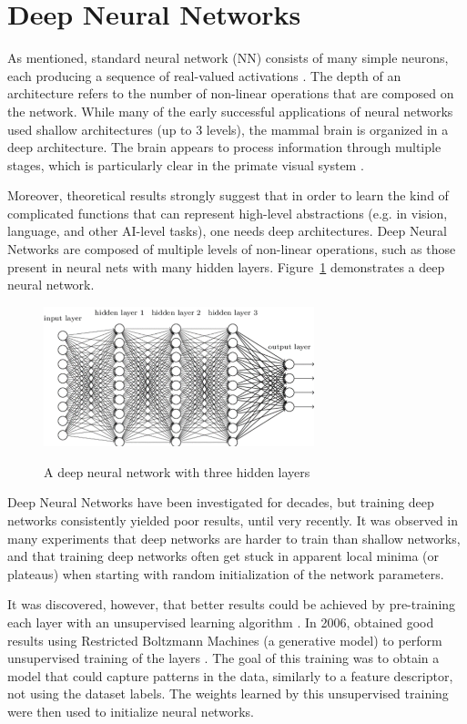 \section{Deep Neural Networks}
\label{sec:deepcnn}
As mentioned, standard neural network (NN) consists of many simple neurons, each producing a sequence of real-valued activations \cite{deepnn}. The depth of an architecture refers to the number of non-linear operations that are composed on the network. While many of the early successful applications of neural networks used shallow architectures (up to 3 levels), the mammal brain is organized in a deep architecture. The brain appears to process information through multiple stages, which is particularly clear in the primate visual system \cite{bengio2009learning}.

Moreover, theoretical results strongly suggest that in order to learn the kind of complicated functions that can represent high-level abstractions (e.g. in vision, language, and other AI-level tasks), one needs deep architectures. Deep Neural Networks are composed of multiple levels of non-linear operations, such as those present in neural nets with many hidden layers\cite{bengio2009learning}. Figure~\ref{fig:deepl} demonstrates a deep neural network. 

\begin{figure}[H]
	\centering
	{\includegraphics[width=0.7\textwidth]{images/deepnn}}
	\caption{A deep neural network with three hidden layers}
	\label{fig:deepl}
\end{figure}

Deep Neural Networks have been investigated for decades, but training deep networks consistently yielded poor results, until very recently. It was observed in many experiments that deep networks are harder to train than shallow networks, and that training deep networks often get stuck in apparent local minima (or plateaus) when starting with random initialization of the network parameters.

It was discovered, however, that better results could be achieved by pre-training each layer with an unsupervised learning algorithm \cite{hinton2006fast}. In 2006, \citeauthor{hinton2006fast} obtained good results using Restricted Boltzmann Machines (a generative model) to perform unsupervised training of the layers \cite{hinton2006fast}. The goal of this training was to obtain a model that could capture patterns in the data, similarly to a feature descriptor, not using the dataset labels. The weights learned by this unsupervised training were then used to initialize neural networks. 

